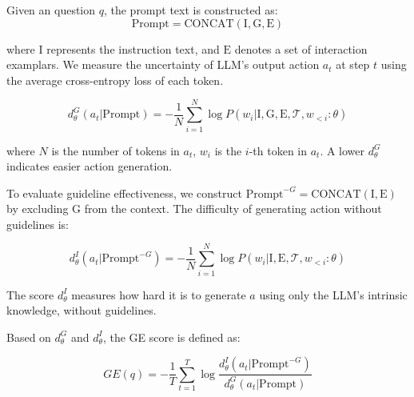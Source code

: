 
Given an question $q$, the prompt text is constructed as:
\begin{equation}
    \text{Prompt}=\text{CONCAT}(\text{I}, \text{G}, \text{E}) 
\end{equation}

where $\text{I}$ represents the instruction text, and $\text{E}$ denotes a set of interaction examplars. 
We measure the uncertainty of LLM's output action $a_t$ at step $t$ using the average cross-entropy loss of each token.

\begin{equation}
d_\theta^G(a_t|\text{Prompt}) = -\frac{1}{N}\sum_{i=1}^{N} \log P(w_i | \text{I},\text{G}, \text{E}, \mathcal{T}, w_{<i}:\theta)
\end{equation}

where $N$ is the number of tokens in $a_t$, $w_i$ is the $i$-th token in $a_t$. A lower $d_\theta^G$ indicates easier action generation.

To evaluate guideline effectiveness, we construct $\text{Prompt}^{-G} = \text{CONCAT}(\text{I}, \text{E})$ by excluding $\text{G}$ from the context. The difficulty of generating action without guidelines is:

\begin{equation}
d_\theta^I(a_t|\text{Prompt}^{-G}) = -\frac{1}{N}\sum_{i=1}^{N} \log P(w_i | \text{I},\text{E}, \mathcal{T}, w_{<i}:\theta)
\end{equation}

The score $d_\theta^I$ measures how hard it is to generate $a$ using only the LLM's intrinsic knowledge, without guidelines.

Based on $d_\theta^G$ and $d_\theta^I$, the GE score is defined as:   

\begin{equation}
GE(q) = -\frac{1}{T}\sum_{t=1}^T \log\frac{d_\theta^I(a_t|\text{Prompt}^{-G})}{d_\theta^G(a_t|\text{Prompt})}
\end{equation}

